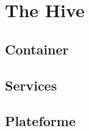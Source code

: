 \section{The Hive}


\subsection{Container} %





\subsection{Services} %





\subsection{Plateforme} %





